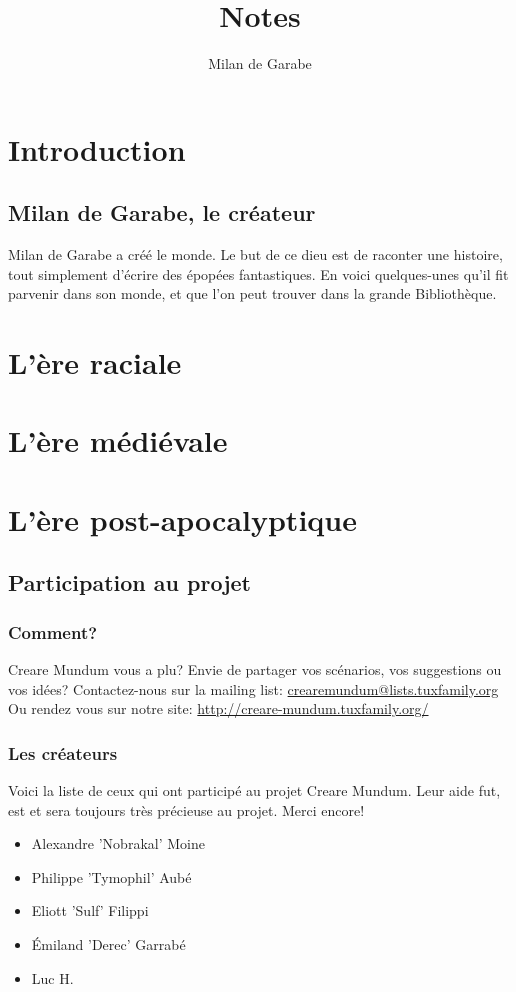 \documentclass{book}
\title{Notes}
\author{Milan de Garabe}
\date{\oldstylenums{\insertdate}}
\begin{document}
\maketitle
\setcounter{tocdepth}{2} %
\renewcommand{\contentsname}{Sommaire} 
\tableofcontents
\chapter{Introduction}
\section{Milan de Garabe, le créateur}
Milan de Garabe a créé le monde. Le but de ce dieu est de raconter une histoire, tout simplement d'écrire des épopées fantastiques. En voici quelques-unes qu'il fit parvenir dans son monde, et que l'on peut trouver dans la grande Bibliothèque.

\chapter{L'ère raciale}



\chapter{L'ère médiévale}


\chapter{L'ère post-apocalyptique}


\newpage
\section{Participation au projet}
\subsection{Comment?}
\hypertarget{participation}{}
Creare Mundum vous a plu? 
Envie de partager vos scénarios, vos suggestions ou vos idées?
\newline
Contactez-nous sur la mailing list: \href {mailto:crearemundum@lists.tuxfamily.org}{crearemundum@lists.tuxfamily.org}
\newline
Ou rendez vous sur notre site: \href {http://creare-mundum.tuxfamily.org/} {http://creare-mundum.tuxfamily.org/}
\subsection{Les créateurs}
Voici la liste de ceux qui ont participé au projet Creare Mundum. Leur aide fut, est et sera toujours très précieuse au projet. Merci encore!  
\begin{itemize}
\item Alexandre ’Nobrakal’ Moine 
\item Philippe ’Tymophil’ Aubé 
\item Eliott ’Sulf’ Filippi
\item Émiland ’Derec’ Garrabé
\item Luc H.
\end{itemize}
\end{document}
